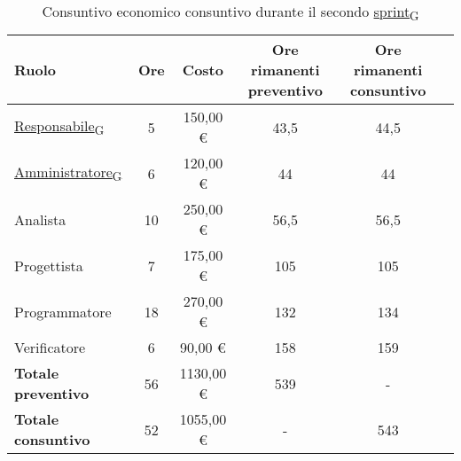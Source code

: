 \begin{table}[!h]
	\centering
	\begin{tabular}{ | l | c | c | c | c | c | }
		\hline
		\textbf{Ruolo}             & \textbf{Ore} & \textbf{Costo} & \textbf{Ore rimanenti preventivo} & \textbf{Ore rimanenti consuntivo} \\
		\hline
		\href{https://7last.github.io/docs/rtb/documentazione-interna/glossario\#responsabile}{Responsabile\textsubscript{G}}               & 5            & 150,00 €       & 43,5                              & 44,5                              \\
		\href{https://7last.github.io/docs/rtb/documentazione-interna/glossario\#amministratore}{Amministratore\textsubscript{G}}             & 6            & 120,00 €       & 44                                & 44                                \\
		Analista                   & 10           & 250,00 €       & 56,5                              & 56,5                              \\
		Progettista                & 7            & 175,00 €       & 105                               & 105                               \\
		Programmatore              & 18           & 270,00 €       & 132                               & 134                               \\
		Verificatore               & 6            & 90,00 €        & 158                               & 159                               \\
		\hline
		\textbf{Totale preventivo} & 56           & 1130,00 €      & 539                               & -                                 \\
		\hline
		\textbf{Totale consuntivo} & 52           & 1055,00 €      & -                                 & 543                               \\
		\hline
	\end{tabular}
	\caption{Consuntivo economico consuntivo durante il secondo \href{https://7last.github.io/docs/rtb/documentazione-interna/glossario\#sprint}{sprint\textsubscript{G}}}
	
\end{table}


